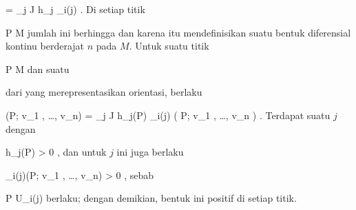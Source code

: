{{\mavergleichskettedisp
{\vergleichskette
{ \omega
}
{ =} { \sum_{j \in J} h_j \omega_{i(j)}
}
{ } {
}
{ } {
}
{ } {
}
}
{}{}{.}
Di setiap titik

\mavergleichskette
{\vergleichskette
{ P
}
{ \in }{ M
}
{  }{
}
{    }{
}
{   }{
}
}
{}{}{}
jumlah ini berhingga dan karena itu mendefinisikan suatu bentuk diferensial kontinu berderajat $n$ pada $M$. Untuk suatu titik

\mavergleichskette
{\vergleichskette
{ P
}
{ \in }{ M
}
{  }{
}
{    }{
}
{   }{
}
}
{}{}{}
dan suatu

 dari
 yang merepresentasikan orientasi, berlaku

\mavergleichskettedisp
{\vergleichskette
{ \omega(P; v_1 , \ldots , v_n)
}
{ =} { \sum_{j \in J} h_j(P) \omega_{i(j)} \left(  P; v_1 , \ldots , v_n  \right)
}
{ } {
}
{ } {
}
{ } {
}
}
{}{}{.}
Terdapat suatu $j$ dengan

\mavergleichskette
{\vergleichskette
{ h_j(P)
}
{ > }{ 0
}
{  }{
}
{    }{
}
{   }{
}
}
{}{}{,}
dan untuk $j$ ini juga berlaku

\mavergleichskette
{\vergleichskette
{ \omega_{i(j)}(P; v_1 , \ldots , v_n)
}
{ > }{ 0
}
{  }{
}
{    }{
}
{   }{
}
}
{}{}{,}
sebab

\mavergleichskette
{\vergleichskette
{ P
}
{ \in }{ U_{i(j)}
}
{  }{
}
{    }{
}
{   }{
}
}
{}{}{}
berlaku; dengan demikian, bentuk ini positif di setiap titik.}
{}

}
